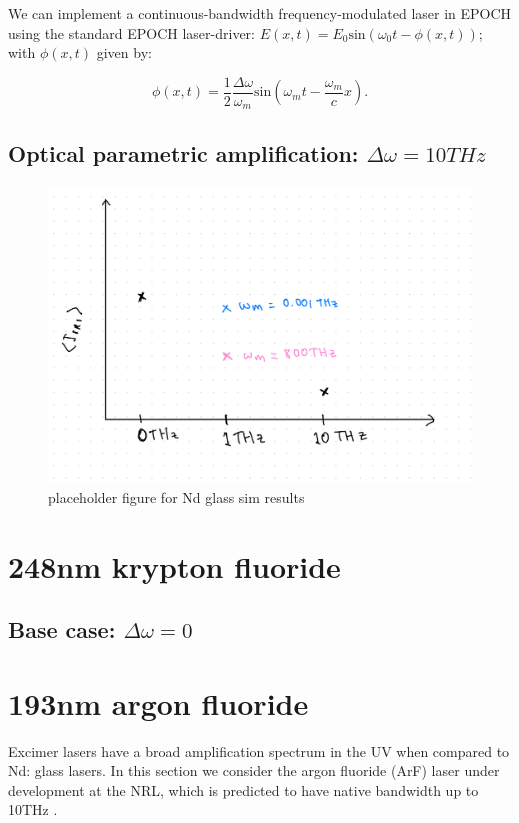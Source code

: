 We can implement a continuous-bandwidth frequency-modulated laser in EPOCH using the standard EPOCH laser-driver: $E(x,t) = E_0\text{sin}\left(\omega_0 t - \phi(x,t)\right)$; with $\phi(x,t)$ given by:

\begin{equation}
	\phi(x,t) = \frac{1}{2}\frac{\Delta\omega}{\omega_m}\text{sin}	 	 \left(\omega_mt - \frac{\omega_m}{c}x\right).
\end{equation}


\subsection{Optical parametric amplification: $\Delta\omega=10\si{THz}$}

\begin{figure}[ht]
   \centering
    \includegraphics[width=0.75\columnwidth]{Chapters/C5_broadband/ndglass_placeholder.jpeg}
    \caption{placeholder figure for Nd glass sim results}
    \label{fig:NdGlass}
\end{figure}{}

\section{248nm krypton fluoride}\label{sec:248}

\subsection{Base case: $\Delta\omega=0$}

\section{193nm argon fluoride}\label{sec:193}
Excimer lasers have a broad amplification spectrum in the UV when compared to Nd: glass lasers. In this section we consider the argon fluoride (ArF) laser under development at the NRL, which is predicted to have native bandwidth up to 10THz \citep{Obenschain2020}.

